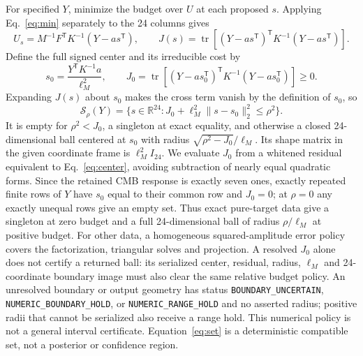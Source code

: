 \documentclass[aps,prd,onecolumn,11pt,nofootinbib,notitlepage]{revtex4-2}
\begin{document}
For specified $Y$, minimize the budget over $U$ at each proposed $s$. Applying Eq.~\eqref{eq:min} separately to the 24 columns gives
\begin{equation}
 U_s=M^{-1}F^{\mathsf T}K^{-1}(Y-a s^{\mathsf T}),\qquad
 J(s)=\operatorname{tr}\left[(Y-a s^{\mathsf T})^{\mathsf T}K^{-1}(Y-a s^{\mathsf T})\right].
 \label{eq:conditional}
\end{equation}
Define the full signed center and its irreducible cost by
\begin{equation}
 s_0=\frac{Y^{\mathsf T}K^{-1}a}{\ell_M^2},\qquad
 J_0=\operatorname{tr}\left[(Y-a s_0^{\mathsf T})^{\mathsf T}K^{-1}(Y-a s_0^{\mathsf T})\right]\ge0.
 \label{eq:center}
\end{equation}
Expanding $J(s)$ about $s_0$ makes the cross term vanish by the definition of $s_0$, so
\begin{equation}
 \boxed{\mathcal S_\rho(Y)=\{s\in\mathbb R^{24}:J_0+\ell_M^2\|s-s_0\|_2^2\le\rho^2\}.}
 \label{eq:set}
\end{equation}
It is empty for $\rho^2<J_0$, a singleton at exact equality, and otherwise a closed 24-dimensional ball centered at $s_0$ with radius $\sqrt{\rho^2-J_0}/\ell_M$. Its shape matrix in the given coordinate frame is $\ell_M^2 I_{24}$. We evaluate $J_0$ from a whitened residual equivalent to Eq.~\eqref{eq:center}, avoiding subtraction of nearly equal quadratic forms. Since the retained CMB response is exactly seven ones, exactly repeated finite rows of $Y$ have $s_0$ equal to their common row and $J_0=0$; at $\rho=0$ any exactly unequal rows give an empty set. Thus exact pure-target data give a singleton at zero budget and a full 24-dimensional ball of radius $\rho/\ell_M$ at positive budget. For other data, a homogeneous squared-amplitude error policy covers the factorization, triangular solves and projection. A resolved $J_0$ alone does not certify a returned ball: its serialized center, residual, radius, $\ell_M$ and 24-coordinate boundary image must also clear the same relative budget policy. An unresolved boundary or output geometry has status \texttt{BOUNDARY\_UNCERTAIN}, \texttt{NUMERIC\_BOUNDARY\_HOLD}, or \texttt{NUMERIC\_RANGE\_HOLD} and no asserted radius; positive radii that cannot be serialized also receive a range hold. This numerical policy is not a general interval certificate. Equation~\eqref{eq:set} is a deterministic compatible set, not a posterior or confidence region.
\end{document}
